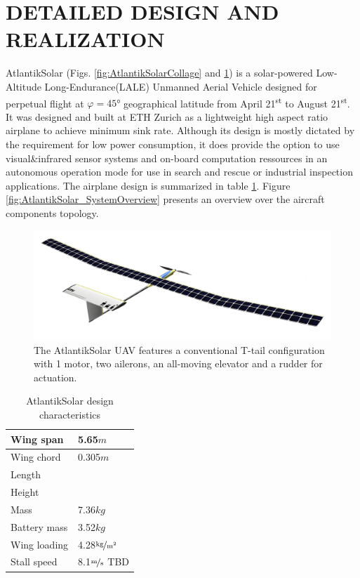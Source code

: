 \section{DETAILED DESIGN AND REALIZATION}

AtlantikSolar (Figs. \ref{fig:AtlantikSolarCollage} and \ref{fig:CAD_AtlantikSolarFull}) is a solar-powered Low-Altitude Long-Endurance(LALE) Unmanned Aerial Vehicle designed for perpetual flight at $\varphi=45°$ geographical latitude from April 21\textsuperscript{st} to August 21\textsuperscript{st}. It was designed and built at ETH Zurich as a lightweight high aspect ratio airplane to achieve minimum sink rate. Although its design is mostly dictated by the requirement for low power consumption, it does provide the option to use visual\&infrared sensor systems and on-board computation ressources in an autonomous operation mode for use in search and rescue or industrial inspection applications. The airplane design is summarized in table \ref{tab:DetailedDesignParameters}. Figure \ref{fig:AtlantikSolar_SystemOverview} presents an overview over the aircraft components topology.

\begin{figure}[tb]
    \centering
    \includegraphics[width=\linewidth]{images/6_CAD_AtlantikSolarFull}
    \caption{The AtlantikSolar UAV features a conventional T-tail configuration with 1 motor, two ailerons, an all-moving elevator and a rudder for actuation.}
    \label{fig:CAD_AtlantikSolarFull}
\end{figure}

\begin{table}
\label{tab:DetailedDesignParameters}
\caption{AtlantikSolar design characteristics}
\begin{center}
\begin{tabular}{l l}
Wing span & 5.65$\unit{m}$\\
\hline Wing chord& 0.305$\unit{m}$\\
\hline Length& \\
\hline Height&\\
\hline Mass& 7.36$\unit{kg}$\\
\hline Battery mass& 3.52$\unit{kg}$\\
\hline Wing loading&4.28$\unitfrac{kg}{m^2}$\\
\hline Stall speed& 8.1$\unitfrac{m}{s}$ TBD\\
\end{tabular}
\end{center}
\end{table}

